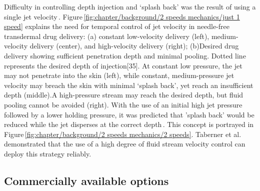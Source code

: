         
        Difficulty in controlling depth injection and ‘splash back’ was the result of using a single jet velocity\,\cite{schramm2002}. Figure\,\ref{fig:chapter/background/2 speeds mechanics/just 1 speed} explains the need for temporal control of jet velocity in needle-free transdermal drug delivery: (a) constant low-velocity delivery (left), medium-velocity delivery (center), and high-velocity delivery (right); (b)Desired drug delivery showing sufficient penetration depth and minimal pooling. Dotted line represents the desired depth of injection[35]. At constant low pressure, the jet may not penetrate into the skin (left), while constant, medium-pressure jet velocity may breach the skin with minimal ‘splash back’, yet reach an insufficient depth (middle).A high-pressure stream may reach the desired depth, but fluid pooling cannot be avoided (right). With the use of an initial high jet pressure followed by a lower holding pressure, it was predicted that ’splash back’ would be reduced while the jet disperses at the correct depth\,\cite{wendell2006}. This concept is portrayed in Figure\,\ref{fig:chapter/background/2 speeds mechanics/2 speeds}. Taberner et al.\,\cite{taberner2012} demonstrated that the use of a high degree of fluid stream velocity control can deploy this strategy reliably.
    
    
    \subsection{Commercially available options}     \label{Chapter:background/needle-free jet injection/commercially available options}
        
